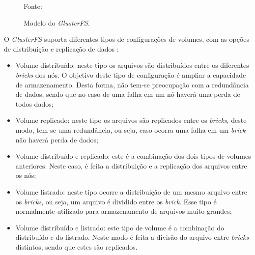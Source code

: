 \begin{figure}[h!]
 \centering
 \caption{Modelo do \textit{GlusterFS}.}
 Fonte: \citet{davies2013}
 \label{fig:glusterfs}
\end{figure}

O \textit{GlusterFS} suporta diferentes tipos de configurações de volumes, com as opções de distribuição e replicação de dados \cite{glusterfs}:
\begin{itemize}
 \item Volume distribuído: neste tipo os arquivos são distribuídos entre os diferentes \textit{bricks} dos nós. O objetivo deste tipo de 
 configuração é ampliar a capacidade de armazenamento. Desta forma, não tem-se preocupação com a redundância de dados, sendo que no caso de uma
 falha em um nó haverá uma perda de todos dados;
 \item Volume replicado: neste tipo os arquivos são replicados entre os \textit{bricks}, deste modo, tem-se uma redundância, ou seja, caso ocorra
 uma falha em um \textit{brick} não haverá perda de dados;
 \item Volume distribuído e replicado: este é a combinação dos dois tipos de volumes anteriores. Neste caso, é feita a distribuição 
 e a replicação dos arquivos entre os nós;
 \item Volume listrado: neste tipo ocorre a distribuição de um mesmo arquivo entre os \textit{bricks}, ou seja, um arquivo é dividido entre os
 \textit{brick}. Esse tipo é normalmente utilizado para armazenamento de arquivos muito grandes;
 \item Volume distribuído e listrado: este tipo de volume é a combinação do distribuído e do listrado. Neste modo é feita a divisão do arquivo 
 entre \textit{bricks} distintos, sendo que estes são replicados.
\end{itemize}

